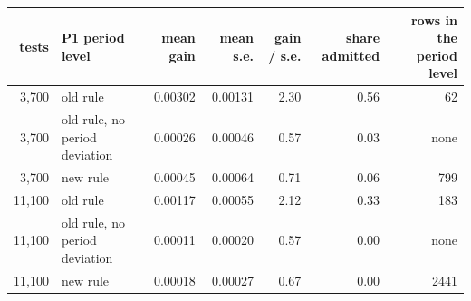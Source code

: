 \begin{tabular}{rlrrrrr}
\toprule
tests & P1 period level & mean gain & mean s.e. & gain / s.e. & share admitted & rows in the period level \\
\midrule
3,700 & old rule & 0.00302 & 0.00131 & 2.30 & 0.56 & 62 \\
3,700 & old rule, no period deviation & 0.00026 & 0.00046 & 0.57 & 0.03 & none \\
3,700 & new rule & 0.00045 & 0.00064 & 0.71 & 0.06 & 799 \\
11,100 & old rule & 0.00117 & 0.00055 & 2.12 & 0.33 & 183 \\
11,100 & old rule, no period deviation & 0.00011 & 0.00020 & 0.57 & 0.00 & none \\
11,100 & new rule & 0.00018 & 0.00027 & 0.67 & 0.00 & 2441 \\
\bottomrule
\end{tabular}
